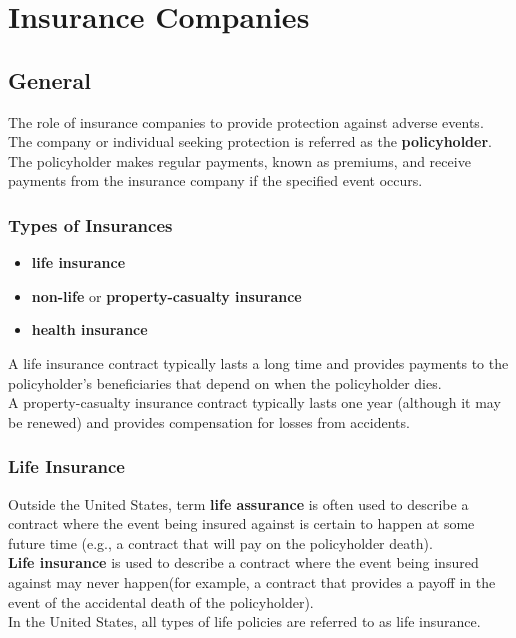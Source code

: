 \chapter{Insurance Companies}

\section{General}
The role of insurance companies to provide protection against adverse events.\\
The company or individual seeking protection is referred as the \textbf{\color{blue} policyholder}.\\
The policyholder makes regular payments, known as premiums, and receive payments from the insurance company if the specified event occurs.

\subsection{Types of Insurances}
\begin{itemize}
	\item \textbf{\color{blue}life  insurance}
	\item \textbf{\color{blue}non-life} or \textbf{\color{blue}property-casualty insurance}
	\item \textbf{\color{blue}health insurance}
\end{itemize}
A life insurance contract typically lasts a long time and provides payments to the policyholder's beneficiaries that depend on when the policyholder dies.\\
A property-casualty insurance contract typically lasts one year (although it may be renewed) and provides compensation for losses from accidents.

\subsection{Life Insurance}
Outside the United States, term \textbf{\color{blue}life assurance} is often used to describe a contract where the event being insured against is certain to happen at some future time (e.g., a contract that will pay on the policyholder death).\\
\textbf{\color{blue}Life insurance} is used to describe a contract where the event being insured against may never happen(for example, a contract that provides a payoff in the event of the accidental death of the policyholder).\\
In the United States, all types of life policies are referred to as life insurance.

